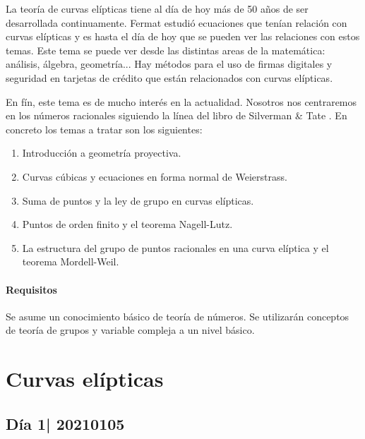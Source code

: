 \documentclass[12pt]{memoir}
\begin{document}
\maketitle
{\small
\setlength{\parindent}{0em}
\setlength{\parskip}{1em}

La teoría de curvas elípticas tiene al día de hoy más de 50 años de ser desarrollada continuamente. Fermat estudió ecuaciones que tenían relación  con curvas elípticas y es hasta el día de hoy que se pueden ver las relaciones con estos temas. Este tema se puede ver desde las distintas areas de la matemática: análisis, álgebra, geometría... Hay métodos para el uso de firmas digitales y seguridad en tarjetas de crédito que están relacionados con curvas elípticas.\par
En fín, este tema es de mucho interés en la actualidad. Nosotros nos centraremos en los números racionales siguiendo la línea del libro de Silverman \& Tate \cite{SilvermanTate}. En concreto los temas a tratar son los siguientes:
\begin{enumerate}
  \item Introducción a geometría proyectiva.
  \item Curvas cúbicas y ecuaciones en forma normal de Weierstrass.
  \item Suma de puntos y la ley de grupo en curvas elípticas.
  \item Puntos de orden finito y el teorema Nagell-Lutz.
  \item La estructura del grupo de puntos racionales en una curva elíptica y el teorema Mordell-Weil.
\end{enumerate}


\subsubsection*{Requisitos}
Se asume un conocimiento básico de teoría de números. Se utilizarán conceptos de teoría de grupos y variable compleja a un nivel básico.
}
\newpage
\tableofcontents

\chapter{Curvas elípticas}

\section{Día 1| 20210105}
\end{document}
